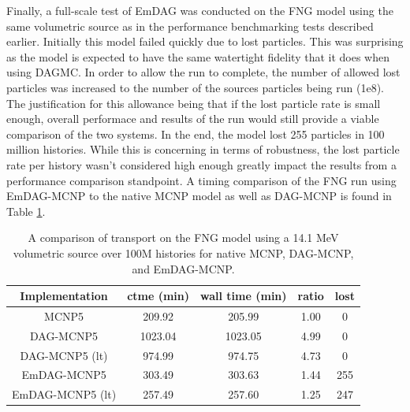 \documentclass[12pt, a4paper]{article}
\begin{document}
Finally, a full-scale test of EmDAG was conducted on the FNG model using the same volumetric source as in the performance benchmarking tests described earlier. Initially this model failed quickly due to lost particles. This was surprising as the model is expected to have the same watertight fidelity that it does when using DAGMC. In order to allow the run to complete, the number of allowed lost particles was increased to the number of the sources particles being run (1e8). The justification for this allowance being that if the lost particle rate is small enough, overall performace and results of the run would still provide a viable comparison of the two systems. In the end, the model lost 255 particles in 100 million histories. While this is concerning in terms of robustness, the lost particle rate per history wasn't considered high enough greatly impact the results from a performance comparison standpoint. A timing comparison of the FNG run using EmDAG-MCNP to the native MCNP model as well as DAG-MCNP is found in Table \ref{fngemdag}.


\begin{table}[H]
  \small
  \begin{center}
        \begin{tabular}{|c|c|c|c|c|}
      \hline
      \textbf{Implementation} & \textbf{ctme (min)} & \textbf{wall time (min)} & \textbf{ratio} & \textbf{lost} \\
      \hline
      MCNP5 & 209.92 & 205.99 &  1.00 & 0 \\
      \hline
      DAG-MCNP5 & 1023.04 & 1023.05 & 4.99 & 0  \\
      \hline
      DAG-MCNP5 (lt) & 974.99 & 974.75 & 4.73 & 0  \\
      \hline      
      EmDAG-MCNP5 & 303.49 & 303.63 & 1.44 & 255  \\
      \hline
      EmDAG-MCNP5 (lt) & 257.49 & 257.60  & 1.25 & 247 \\
      \hline
    \end{tabular} 
    \caption{A comparison of transport on the FNG model using a 14.1 MeV volumetric source over 100M histories for native MCNP, DAG-MCNP, and EmDAG-MCNP.}
    \label{fngemdag}
  \end{center}
\end{table}
\end{document}
